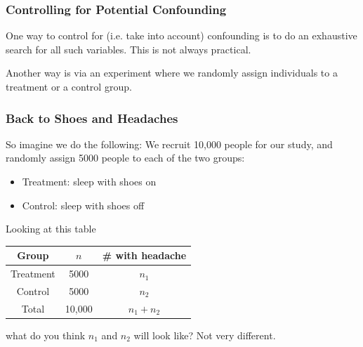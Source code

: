\documentclass[slides]{beamer}\usepackage[]{graphicx}\usepackage[]{color}
\newcommand{\blue}[1]{\textcolor{blue2}{#1}}
\begin{document}
\begin{frame}
\frametitle{Controlling for Potential Confounding}

One way to \blue{control for} (i.e. take into account) confounding is to do an exhaustive search for all such variables.  This is not always practical.

\vspace{0.25cm}

\pause Another way is via an experiment where we randomly assign individuals to a \blue{treatment} or a \blue{control} group.


\end{frame}


\begin{frame}
\frametitle{Back to Shoes and Headaches}

So imagine we do the following:  We recruit 10,000 people for our study, and \blue{randomly assign} 5000 people to each of the two groups:

\pause\begin{itemize}
\item Treatment: sleep with shoes \blue{on}
\item Control: sleep with shoes \blue{off}
\end{itemize}

\pause Looking at this table
\begin{center}
	\begin{tabular}{c|cc}
		Group & $n$ & \# with headache\\
		\hline	
		Treatment & 5000 & $n_1$\\
		Control & 5000 & $n_2$\\
		\hline
		Total & 10,000 & $n_1 + n_2$\\
  \end{tabular}
\end{center}
\pause what do you think $n_1$ and $n_2$ will look like?  \pause Not very different.

\end{frame}
\end{document}
